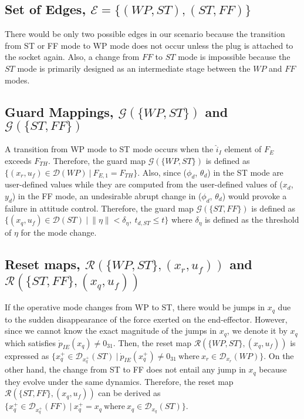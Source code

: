 \documentclass[letterpaper, 10 pt, conference]{ieeeconf}  %
\theoremstyle{definition}
\begin{document}
\subsection{Set of Edges, $\mathcal{E} = \{ (WP,ST), (ST,FF) \}$}
There would be only two possible edges in our scenario because the transition from ST or FF mode to WP mode does not occur unless the plug is attached to the socket again. Also, a change from $FF$ to $ST$ mode is impossible because the $ST$ mode is primarily designed as an intermediate stage between the $WP$ and $FF$ modes.

\subsection{Guard Mappings, $\mathcal{G}(\{WP,ST\})$ and $\mathcal{G}(\{ST,FF\})$}
A transition from WP mode to ST mode occurs when the $\hat{i}_I$ element of $F_E$ exceeds $F_{TH}$. Therefore, the guard map $\mathcal{G}(\{WP,ST\})$ is defined as $\{ (x_r, u_f) \in \mathcal{D}(WP) \ | \ F_{E, 1} = F_{TH} \}$. Also, since ($\phi_d$, $\theta_d$) in the ST mode are user-defined values while they are computed from the user-defined values of ($x_d$, $y_d$) in the FF mode, an undesirable abrupt change in ($\phi_d$, $\theta_d$) would provoke a failure in attitude control. Therefore, the guard map $\mathcal{G}(\{ST,FF\})$ is defined as $\{(x_q,u_f) \in \mathcal{D}(ST) \ | \ \| \eta \| < \delta_{\eta}, \ t_{d, ST} \leq t \}$ where $\delta_{\eta}$ is defined as the threshold of $\eta$ for the mode change.

\subsection{Reset maps, $\mathcal{R}(\{ WP,ST \},(x_r, u_f))$ and $\mathcal{R}(\{ ST,FF \},(x_q, u_f))$}
If the operative mode changes from WP  to ST, there would be jumps in $x_q$ due to the sudden disappearance of the force exerted on the end-effector. However, since we cannot know the exact magnitude of the jumps in $x_q$, we denote it by $x_q$ which satisfies $\dot{p}_{I E}(x_q) \neq 0_{31}$. Then, the reset map $\mathcal{R}(\{ WP,ST \},(x_q, u_f))$ is expressed as $\{ x_q^{+} \in \mathcal{D}_{x_q^{+}}(ST) \ | \ \dot{p}_{I E}(x_q^{+}) \neq 0_{31} \ \textrm{where} \ x_r \in \mathcal{D}_{x_r}(WP) \}$. On the other hand, the change from ST  to FF does not entail any jump in $x_q$ because they evolve under the same dynamics. Therefore, the reset map $\mathcal{R}(\{ ST,FF \},(x_q, u_f))$ can be derived as $\{ x_q^{+} \in \mathcal{D}_{x_q^{+}}(FF) \ | \ x_q^{+} = x_q \ \textrm{where} \ x_q \in \mathcal{D}_{x_q}(ST) \}$.
\end{document}

